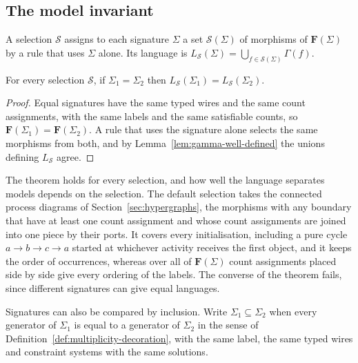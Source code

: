 \subsection{The model invariant}
\label{subsec:theorem}
\label{subsec:minimal-signatures}

A selection $\mathcal{S}$ assigns to each signature $\Sigma$ a set $\mathcal{S}(\Sigma)$ of morphisms of
$\mathbf{F}(\Sigma)$ by a rule that uses $\Sigma$ alone. Its language is
$L_{\mathcal{S}}(\Sigma)=\bigcup_{f\in \mathcal{S}(\Sigma)}\Gamma(f)$.

\begin{theorem}
  \label{thm:canonical-presentation}
  For every selection $\mathcal{S}$, if $\Sigma_1=\Sigma_2$ then $L_{\mathcal{S}}(\Sigma_1)=L_{\mathcal{S}}(\Sigma_2)$.
\end{theorem}
\begin{proof}
  Equal signatures have the same typed wires and the same count assignments, with the same labels and the same
  satisfiable counts, so $\mathbf{F}(\Sigma_1)=\mathbf{F}(\Sigma_2)$. A rule that uses the
  signature alone selects the same morphisms from both, and by
  Lemma~\ref{lem:gamma-well-defined} the unions defining $L_{\mathcal{S}}$ agree.
\end{proof}

The theorem holds for every selection, and how well the language separates models depends on the
selection. The default selection takes the connected process diagrams of Section~\ref{sec:hypergraphs},
the morphisms with any boundary that have at least one count assignment and whose count assignments are
joined into one piece by their ports. It covers every
initialisation, including a pure cycle $a\to b\to c\to a$ started at whichever activity receives the first object, and it
keeps the order of occurrences, whereas over all of $\mathbf{F}(\Sigma)$ count assignments placed side by side
give every ordering of the labels. The converse of the theorem fails, since different signatures
can give equal languages.

Signatures can also be compared by inclusion. Write $\Sigma_1\subseteq\Sigma_2$ when every generator of
$\Sigma_1$ is equal to a generator of $\Sigma_2$ in the sense of
Definition~\ref{def:multiplicity-decoration}, with the same label, the same typed wires and
constraint systems with the same solutions.

